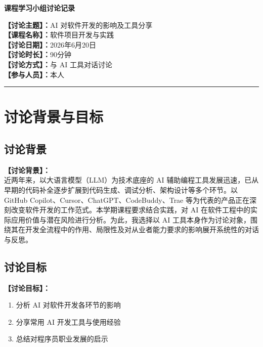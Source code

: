 \documentclass[12pt,a4paper]{article}
\begin{document}
\begin{center}
    {\LARGE\bfseries 课程学习小组讨论记录}\\[1cm]
\end{center}

\noindent
\textbf{【讨论主题】：}AI 对软件开发的影响及工具分享\\[6pt]
\textbf{【课程名称】：}软件项目开发与实践\\[6pt]
\textbf{【讨论日期】：}2026年6月20日\\[6pt]
\textbf{【讨论时长】：}90分钟\\[6pt]
\textbf{【讨论方式】：}与 AI 工具对话讨论\\[6pt]
\textbf{【参与人员】：}本人\\[12pt]

\rule{\textwidth}{0.8pt}

\section{讨论背景与目标}

\subsection{讨论背景}
\textbf{【讨论背景】：}\\[4pt]
\indent 近两年来，以大语言模型（LLM）为技术底座的 AI 辅助编程工具发展迅速，已从早期的代码补全逐步扩展到代码生成、调试分析、架构设计等多个环节。以 GitHub Copilot、Cursor、ChatGPT、CodeBuddy、Trae 等为代表的产品正在深刻改变软件开发的工作范式。本学期课程要求结合实践，对 AI 在软件工程中的实际应用价值与潜在风险进行分析。为此，我选择以 AI 工具本身作为讨论对象，围绕其在开发全流程中的作用、局限性及对从业者能力要求的影响展开系统性的对话与反思。

\subsection{讨论目标}
\textbf{【讨论目标】：}
\begin{enumerate}[label=\arabic*.]
    \item 分析 AI 对软件开发各环节的影响
    \item 分享常用 AI 开发工具与使用经验
    \item 总结对程序员职业发展的启示
\end{enumerate}
\end{document}

